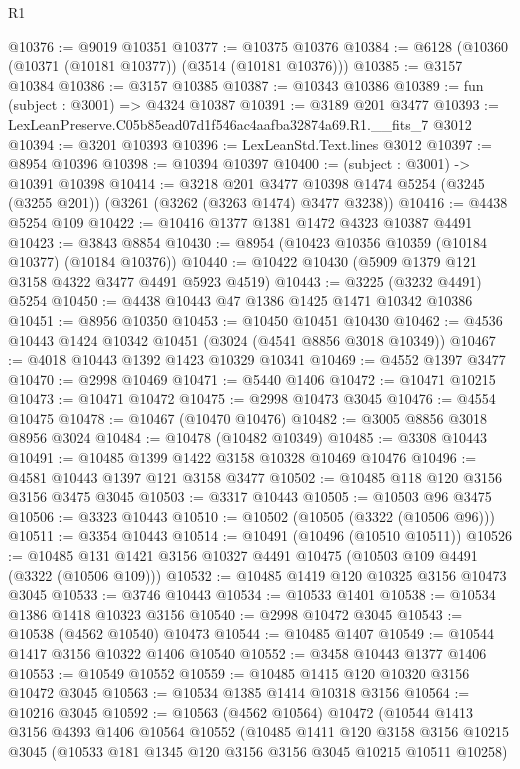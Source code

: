 \begin{lexlean}{R1}
\begin{coremodule}
@10376 := @9019 @10351
@10377 := @10375 @10376
@10384 := @6128 (@10360 (@10371 (@10181 @10377)) (@3514 (@10181 @10376)))
@10385 := @3157 @10384
@10386 := @3157 @10385
@10387 := @10343 @10386
@10389 := fun (subject : @3001) => @4324 @10387
@10391 := @3189 @201 @3477
@10393 := LexLeanPreserve.C05b85ead07d1f546ac4aafba32874a69.R1.__fits_7 @3012
@10394 := @3201 @10393
@10396 := LexLeanStd.Text.lines @3012
@10397 := @8954 @10396
@10398 := @10394 @10397
@10400 := (subject : @3001) -> @10391 @10398
@10414 := @3218
    @201
    @3477
    @10398
    @1474
    @5254
    (@3245 (@3255 @201))
    (@3261 (@3262 (@3263 @1474) @3477 @3238))
@10416 := @4438 @5254 @109
@10422 := @10416 @1377 @1381 @1472 @4323 @10387 @4491
@10423 := @3843 @8854
@10430 := @8954 (@10423 @10356 @10359 (@10184 @10377) (@10184 @10376))
@10440 := @10422 @10430 (@5909 @1379 @121 @3158 @4322 @3477 @4491 @5923 @4519)
@10443 := @3225 (@3232 @4491) @5254
@10450 := @4438 @10443 @47 @1386 @1425 @1471 @10342 @10386
@10451 := @8956 @10350
@10453 := @10450 @10451 @10430
@10462 := @4536 @10443 @1424 @10342 @10451 (@3024 (@4541 @8856 @3018 @10349))
@10467 := @4018 @10443 @1392 @1423 @10329 @10341
@10469 := @4552 @1397 @3477
@10470 := @2998 @10469
@10471 := @5440 @1406
@10472 := @10471 @10215
@10473 := @10471 @10472
@10475 := @2998 @10473 @3045
@10476 := @4554 @10475
@10478 := @10467 (@10470 @10476)
@10482 := @3005 @8856 @3018 @8956 @3024
@10484 := @10478 (@10482 @10349)
@10485 := @3308 @10443
@10491 := @10485 @1399 @1422 @3158 @10328 @10469 @10476
@10496 := @4581 @10443 @1397 @121 @3158 @3477
@10502 := @10485 @118 @120 @3156 @3156 @3475 @3045
@10503 := @3317 @10443
@10505 := @10503 @96 @3475
@10506 := @3323 @10443
@10510 := @10502 (@10505 (@3322 (@10506 @96)))
@10511 := @3354 @10443
@10514 := @10491 (@10496 (@10510 @10511))
@10526 := @10485 @131 @1421 @3156 @10327 @4491 @10475 (@10503 @109 @4491 (@3322 (@10506 @109)))
@10532 := @10485 @1419 @120 @10325 @3156 @10473 @3045
@10533 := @3746 @10443
@10534 := @10533 @1401
@10538 := @10534 @1386 @1418 @10323 @3156
@10540 := @2998 @10472 @3045
@10543 := @10538 (@4562 @10540) @10473
@10544 := @10485 @1407
@10549 := @10544 @1417 @3156 @10322 @1406 @10540
@10552 := @3458 @10443 @1377 @1406
@10553 := @10549 @10552
@10559 := @10485 @1415 @120 @10320 @3156 @10472 @3045
@10563 := @10534 @1385 @1414 @10318 @3156
@10564 := @10216 @3045
@10592 := @10563
    (@4562 @10564)
    @10472
    (@10544
      @1413
      @3156
      @4393
      @1406
      @10564
      @10552
      (@10485
        @1411
        @120
        @3158
        @3156
        @10215
        @3045
        (@10533 @181 @1345 @120 @3156 @3156 @3045 @10215 @10511 @10258)

\end{coremodule}
\end{lexlean}
